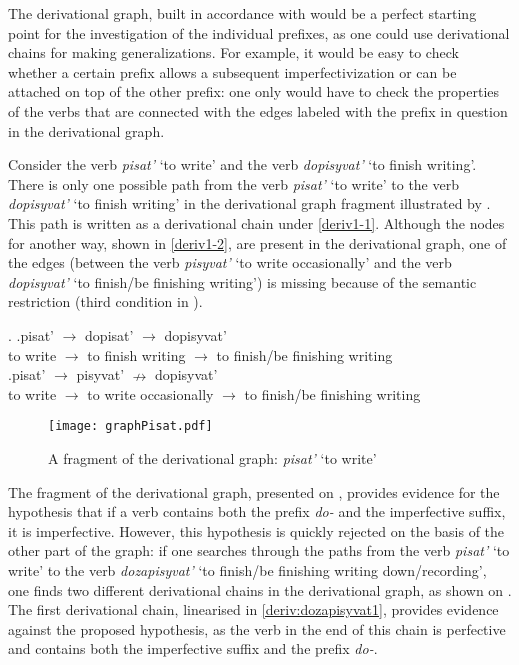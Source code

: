 The derivational graph, built in accordance with  would be a perfect starting point for the investigation of the individual prefixes, as one could use derivational chains for making generalizations. For example, it would be easy to check whether a certain prefix allows a subsequent imperfectivization or can be attached on top of the other prefix: one only would have to check the properties of the verbs that are connected with the edges labeled with the prefix in question in the derivational graph. 

Consider the verb \textit{pisat'} `to write' and the verb \textit{dopisyvat'} `to finish writing'. There is only one possible path from the verb \textit{pisat'} `to write' to the verb \textit{dopisyvat'} `to finish writing' in the derivational graph fragment illustrated by . This path is written as a derivational chain under \ref{deriv1-1}. Although the nodes for another way, shown in \ref{deriv1-2}, are present in the derivational graph, one of the edges (between the verb \textit{pisyvat'} `to write occasionally' and the verb \textit{dopisyvat'} `to finish/be finishing writing') is missing because of the semantic restriction (third condition in ).

\ex.\label{deriv1} \ag.\label{deriv1-1}pisat'\textsuperscript{\IPF} $\rightarrow$ dopisat'\textsuperscript{\PF} $\rightarrow$ dopisyvat'\textsuperscript{\IPF}\\
{to write} $\rightarrow$ {to finish writing} $\rightarrow$ {to finish/be finishing writing}\\
\bg.\label{deriv1-2}pisat'\textsuperscript{\IPF} $\rightarrow$ pisyvat'\textsuperscript{\IPF} $\nrightarrow$ dopisyvat'\\
{to write} $\rightarrow$ {to write occasionally} $\rightarrow$ {to finish/be finishing writing}\\

\begin{figure}
\begin{center}
\texttt{[image: graphPisat.pdf]}
\caption{A fragment of the derivational graph: \textit{pisat'} `to write'\label{tree:dopisyvat}}
\end{center}
\end{figure}

The fragment of the derivational graph, presented on , provides evidence for the hypothesis that if a verb contains both the prefix \textit{do-} and the imperfective suffix, it is imperfective. However, this hypothesis is quickly rejected on the basis of the other part of the graph: if one searches through the paths from the verb \textit{pisat'} `to write' to the verb \textit{dozapisyvat'} `to finish/be finishing writing down/recording', one finds two different derivational chains in the derivational graph, as shown on . The first derivational chain, linearised in \ref{deriv:dozapisyvat1}, provides evidence against the proposed hypothesis, as the verb in the end of this chain is perfective and contains both the imperfective suffix and the prefix \textit{do-}. 

